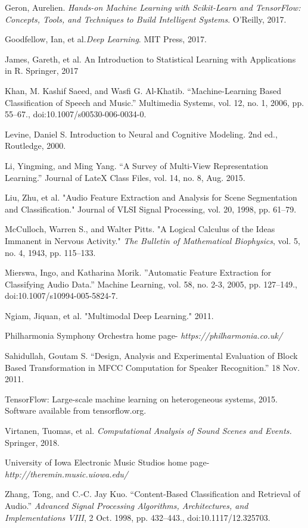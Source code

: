 \documentclass[conference,onecolumn,letterpaper]{IEEEtran}
\begin{document}
\begin{thebibliography}{9}

Geron, Aurelien. \textit{Hands-on Machine Learning with Scikit-Learn and TensorFlow: Concepts, Tools, and Techniques to Build Intelligent Systems}. O'Reilly, 2017.

Goodfellow, Ian, et al.\textit{Deep Learning}. MIT Press, 2017.

James, Gareth, et al. An Introduction to Statistical Learning with Applications in R. Springer, 2017

Khan, M. Kashif Saeed, and Wasfi G. Al-Khatib. “Machine-Learning Based Classification of Speech and Music.” Multimedia Systems, vol. 12, no. 1, 2006, pp. 55–67., doi:10.1007/s00530-006-0034-0.

Levine, Daniel S. Introduction to Neural and Cognitive Modeling. 2nd ed., Routledge, 2000.

Li, Yingming, and Ming Yang. “A Survey of Multi-View Representation Learning.” Journal of LateX Class Files, vol. 14, no. 8, Aug. 2015. 

Liu, Zhu, et al. "Audio Feature Extraction and Analysis for Scene Segmentation and Classification." Journal of VLSI Signal Processing, vol. 20, 1998, pp. 61–79.

McCulloch, Warren S., and Walter Pitts. "A Logical Calculus of the Ideas Immanent in Nervous Activity." \textit{The Bulletin of Mathematical Biophysics}, vol. 5, no. 4, 1943, pp. 115–133.

Mierswa, Ingo, and Katharina Morik. ”Automatic Feature Extraction for Classifying Audio Data.” Machine Learning, vol. 58, no. 2-3, 2005, pp. 127–149., doi:10.1007/s10994-005-5824-7.


Ngiam, Jiquan, et al. "Multimodal Deep Learning." 2011. 

Philharmonia Symphony Orchestra home page- \textit{https://philharmonia.co.uk/}

Sahidullah, Goutam S. “Design, Analysis and Experimental Evaluation of Block Based Transformation in MFCC Computation for Speaker Recognition.” 18 Nov. 2011.

TensorFlow: Large-scale machine learning on heterogeneous systems,
2015. Software available from tensorflow.org.

Virtanen, Tuomas, et al. \textit{Computational Analysis of Sound Scenes and Events.} Springer, 2018.

University of Iowa Electronic Music Studios home page- \textit{http://theremin.music.uiowa.edu/}

Zhang, Tong, and C.-C. Jay Kuo. “Content-Based Classification and Retrieval of Audio.” \textit{Advanced Signal Processing Algorithms, Architectures, and Implementations VIII}, 2 Oct. 1998, pp. 432–443., doi:10.1117/12.325703.

\end{thebibliography}

\end{document}
